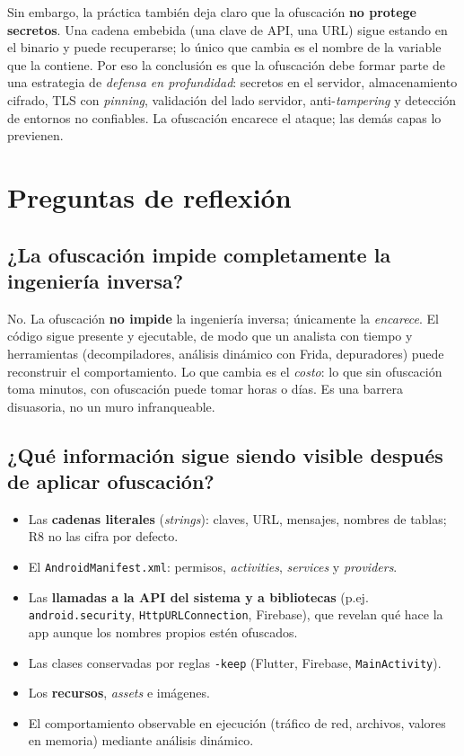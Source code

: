 \documentclass[12pt,letterpaper]{article}
\begin{document}
Sin embargo, la práctica también deja claro que la ofuscación \textbf{no
protege secretos}. Una cadena embebida (una clave de API, una URL) sigue estando
en el binario y puede recuperarse; lo único que cambia es el nombre de la
variable que la contiene. Por eso la conclusión es que la ofuscación debe
formar parte de una estrategia de \emph{defensa en profundidad}: secretos en el
servidor, almacenamiento cifrado, TLS con \emph{pinning}, validación del lado
servidor, anti-\emph{tampering} y detección de entornos no confiables. La
ofuscación encarece el ataque; las demás capas lo previenen.

\section{Preguntas de reflexión}

\subsection*{¿La ofuscación impide completamente la ingeniería inversa?}
No. La ofuscación \textbf{no impide} la ingeniería inversa; únicamente la
\emph{encarece}. El código sigue presente y ejecutable, de modo que un analista
con tiempo y herramientas (decompiladores, análisis dinámico con Frida,
depuradores) puede reconstruir el comportamiento. Lo que cambia es el
\emph{costo}: lo que sin ofuscación toma minutos, con ofuscación puede tomar
horas o días. Es una barrera disuasoria, no un muro infranqueable.

\subsection*{¿Qué información sigue siendo visible después de aplicar ofuscación?}
\begin{itemize}[leftmargin=1.4em]
  \item Las \textbf{cadenas literales} (\emph{strings}): claves, URL, mensajes,
        nombres de tablas; R8 no las cifra por defecto.
  \item El \texttt{AndroidManifest.xml}: permisos, \emph{activities},
        \emph{services} y \emph{providers}.
  \item Las \textbf{llamadas a la API del sistema y a bibliotecas} (p.ej.
        \texttt{android.security}, \texttt{HttpURLConnection}, Firebase), que
        revelan qué hace la app aunque los nombres propios estén ofuscados.
  \item Las clases conservadas por reglas \texttt{-keep} (Flutter, Firebase,
        \texttt{MainActivity}).
  \item Los \textbf{recursos}, \emph{assets} e imágenes.
  \item El comportamiento observable en ejecución (tráfico de red, archivos,
        valores en memoria) mediante análisis dinámico.
\end{itemize}
\end{document}
